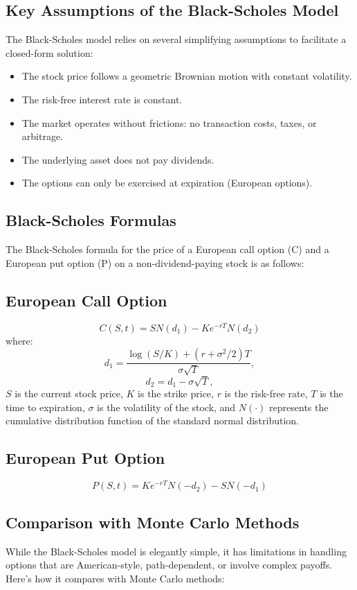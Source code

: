 \documentclass{article}
\begin{document}
\subsection*{Key Assumptions of the Black-Scholes Model}
The Black-Scholes model relies on several simplifying assumptions to facilitate a closed-form solution:
\begin{itemize}
    \item The stock price follows a geometric Brownian motion with constant volatility.
    \item The risk-free interest rate is constant.
    \item The market operates without frictions: no transaction costs, taxes, or arbitrage.
    \item The underlying asset does not pay dividends.
    \item The options can only be exercised at expiration (European options).
\end{itemize}

\subsection*{Black-Scholes Formulas}
The Black-Scholes formula for the price of a European call option (C) and a European put option (P) on a non-dividend-paying stock is as follows:

\subsection{European Call Option}
\[ C(S, t) = S N(d_1) - K e^{-rT} N(d_2) \]
where:
\[ d_1 = \frac{\log(S / K) + (r + \sigma^2 / 2) T}{\sigma \sqrt{T}}, \]
\[ d_2 = d_1 - \sigma \sqrt{T}, \]
\( S \) is the current stock price, \( K \) is the strike price, \( r \) is the risk-free rate, \( T \) is the time to expiration, \( \sigma \) is the volatility of the stock, and \( N(\cdot) \) represents the cumulative distribution function of the standard normal distribution.

\subsection{European Put Option}
\[ P(S, t) = K e^{-rT} N(-d_2) - S N(-d_1) \]

\subsection*{Comparison with Monte Carlo Methods}
While the Black-Scholes model is elegantly simple, it has limitations in handling options that are American-style, path-dependent, or involve complex payoffs. Here's how it compares with Monte Carlo methods:
\end{document}
